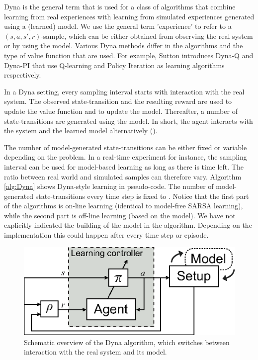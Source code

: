 Dyna is the general term that is used for a class of algorithms that combine learning from real experiences with learning from simulated experiences generated using a (learned) model. We use the general term 'experience' to refer to a $(s,a,s',r)$-sample, which can be either obtained from observing the real system or by using the model. Various Dyna methods differ in the algorithms and the type of value function that are used. For example, Sutton introduces Dyna-Q and Dyna-PI that use Q-learning and Policy Iteration as learning algorithms respectively.

In a Dyna setting, every sampling interval starts with interaction with the real system. The observed state-transition and the resulting reward are used to update the value function and to update the model. Thereafter, a number of state-transitions are generated using the model. In short, the agent interacts with the system and the learned model alternatively ().

The number of model-generated state-transitions can be either fixed or variable depending on the problem. In a real-time experiment for instance, the sampling interval can be used for model-based learning as long as there is time left. The ratio between real world and simulated samples can therefore vary. Algorithm \ref{alg:Dyna} shows Dyna-style learning in pseudo-code. The number of model-generated state-transitions every time step is fixed to . Notice that the first part of the algorithms is on-line learning (identical to model-free SARSA learning), while the second part is off-line learning (based on the model). We have not explicitly indicated the building of the model in the algorithm. Depending on the implementation this could happen after every time step or episode.

\begin{figure}[htbp]
	\centering
		\includegraphics[width=.5\textwidth]{img/DynaFramework}
	\caption[Overview of the Dyna algorithm]{Schematic overview of the Dyna algorithm, which switches between interaction with the real system and its model.}
	\label{fig:RL-DynaFramework}
\end{figure}

